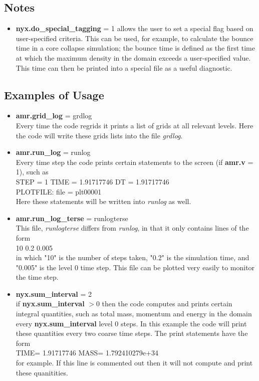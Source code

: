 \subsection{Notes}

\begin{itemize}

\item {\bf nyx.do\_special\_tagging} = 1 allows the user to set a special flag based on
user-specified criteria.  This can be used, for example, to calculate the bounce time in a 
core collapse simulation; the bounce time is defined as the first time at which the maximum
density in the domain exceeds a user-specified value.   This time can then be printed into
a special file as a useful diagnostic.

\end{itemize}

\subsection{Examples of Usage}

\begin{itemize}

\item {\bf amr.grid\_log} = grdlog \\
Every time the code regrids it prints a list of grids at all relevant levels.  
Here the code will write these grids lists into the file {\em grdlog}.

\item {\bf amr.run\_log} = runlog \\ 
Every time step the code prints certain statements to the screen (if {\bf amr.v} = 1), such as \\
STEP = 1 TIME = 1.91717746 DT = 1.91717746 \\
PLOTFILE: file = plt00001 \\
Here these statements will be written into {\em runlog} as well.

\item {\bf amr.run\_log\_terse} = runlogterse \\ 
This file, {\em runlogterse} differs from {\em runlog}, in that it only contains lines
of the form \\ 
10  0.2  0.005 \\
in which "10" is the number of steps taken, "0.2" is the simulation time, and "0.005" is the 
level 0 time step.  This file can be plotted very easily to monitor the time step.

\item {\bf nyx.sum\_interval} = 2 \\
if {\bf nyx.sum\_interval} $> 0$ then the code computes and prints certain integral quantities, 
such as total mass, momentum and energy in the domain every {\bf nyx.sum\_interval} level 0 steps. 
In this example the code will print these quantities every two coarse time steps.  The print 
statements have the form \\
TIME= 1.91717746 MASS= 1.792410279e+34 \\
for example. 
If this line is commented out then it will not compute and print these quanitities.

\end{itemize}

